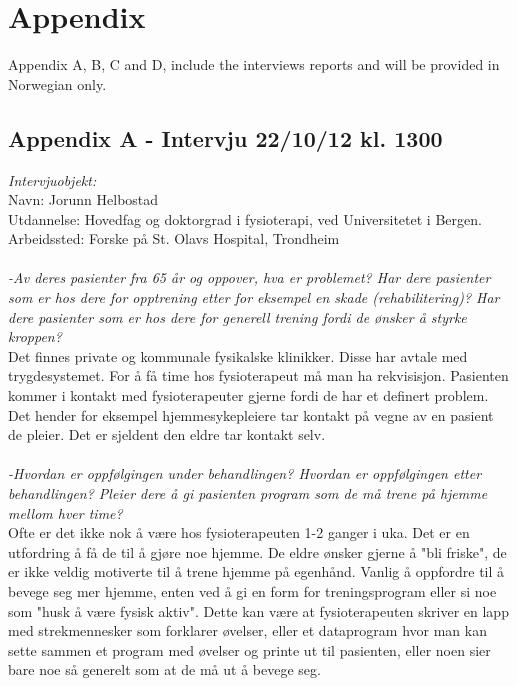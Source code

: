 \appendix
\chapter*{Appendix}
 Appendix A, B, C and D, include the interviews reports and will be provided in Norwegian only.

\section*{Appendix A - Intervju 22/10/12 kl. 1300}
\label{A}

\emph{Intervjuobjekt:}\\
Navn: Jorunn Helbostad \\
Utdannelse: Hovedfag og doktorgrad i fysioterapi, ved Universitetet i Bergen.\\
Arbeidssted: Forske på St. Olavs Hospital, Trondheim\\ \\
\emph{-Av deres pasienter fra 65 år og oppover, hva er problemet? Har dere pasienter som er hos dere for opptrening etter for eksempel en skade (rehabilitering)? Har dere pasienter som er hos dere for generell trening fordi de ønsker å styrke kroppen?}\\
Det finnes private og kommunale fysikalske klinikker. Disse har avtale med trygdesystemet. For å få time hos fysioterapeut må man ha rekvisisjon. Pasienten kommer  i kontakt med fysioterapeuter gjerne fordi de har et definert problem. Det hender for eksempel hjemmesykepleiere tar kontakt på vegne av en pasient de pleier. Det er sjeldent den eldre tar kontakt selv. \\ \\
\emph{-Hvordan er oppfølgingen under behandlingen? Hvordan er oppfølgingen etter behandlingen? Pleier dere å gi pasienten program som de må trene på hjemme mellom hver time?}\\ 
Ofte er det ikke nok å være hos fysioterapeuten 1-2 ganger i uka. Det er en utfordring å få de til å gjøre noe hjemme. De eldre ønsker gjerne å "bli friske", de er ikke veldig motiverte til å trene hjemme på egenhånd. Vanlig å oppfordre til å bevege seg mer hjemme, enten ved å gi en form for treningsprogram eller si noe som "husk å være fysisk aktiv". Dette kan være at fysioterapeuten skriver en lapp med strekmennesker som forklarer øvelser, eller et dataprogram hvor man kan sette sammen et program med øvelser og printe ut til pasienten, eller noen sier bare noe så generelt som at de må ut å bevege seg.\\ \\ 
